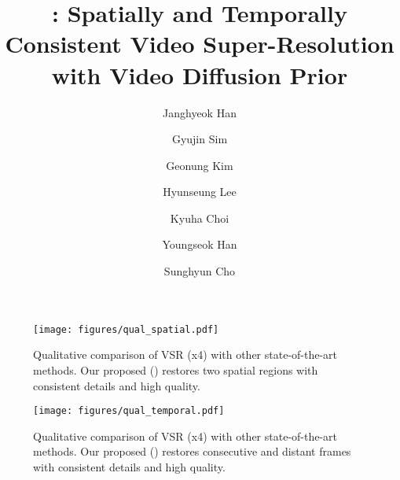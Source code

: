 \documentclass[sigconf, nonacm]{acmart}
\begin{document}


\title{\ours{}: Spatially and Temporally Consistent Video Super-Resolution with Video Diffusion Prior}

\author{Janghyeok Han}

\author{Gyujin Sim}
\authornotemark[1]

\author{Geonung Kim}

\author{Hyunseung Lee}

\author{Kyuha Choi}

\author{Youngseok Han}

\author{Sunghyun Cho}











\begin{figure*}[t]
    \centering
    \texttt{[image: figures/qual\_spatial.pdf]}
    \caption{Qualitative comparison of VSR (x4) with other state-of-the-art methods. Our proposed {\ssi} ({\ssiabb}) restores two spatial regions with consistent details and high quality.}
    \label{fig:spatial_qualitative}
\end{figure*}

\begin{figure*}[t]
    \centering
    \texttt{[image: figures/qual\_temporal.pdf]}
    \caption{Qualitative comparison of VSR (x4) with other state-of-the-art methods. Our proposed {\tfi} ({\tfiabb}) restores consecutive and distant frames with consistent details and high quality.}
    \label{fig:temporal_qualitative}
\end{figure*}
\end{document}
